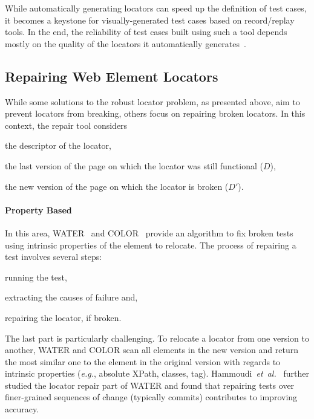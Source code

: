While automatically generating locators can speed up the
definition of test cases, it becomes a keystone for visually-generated test
cases based on record/replay tools. In the end, the reliability of test cases
built using such a tool depends mostly on the quality of the locators it
automatically generates~\cite{hammoudi2016record}.


\subsection{Repairing Web Element Locators}
While some solutions to the robust locator problem, as presented above, aim to prevent locators from breaking, others focus on repairing broken locators.
In this context, the repair tool considers
\begin{inparaenum}[\em a)]
    \item the descriptor of the locator,
    \item the last version of the page on which the locator was still functional ($D$),
    \item the new version of the page on which the locator is broken ($D'$).
\end{inparaenum}

\paragraph{Property Based}
In this area, WATER~\cite{choudhary2011water} and COLOR~\cite{kirinuki2019color}
provide an algorithm to fix broken tests using intrinsic properties of the element
to relocate.
The process of repairing a test involves several steps: 
\begin{inparaenum}
\item running the test, 
\item extracting the causes of failure and,
\item repairing the locator, if broken. 
\end{inparaenum}
The last part is particularly challenging. 
To relocate a locator from one version to another, WATER and COLOR scan all elements in the new version and return the most similar one to the element in the original version with regards to intrinsic properties (\emph{e.g.}, absolute XPath, classes, tag).
Hammoudi~\emph{et~al.}~\cite{hammoudi2016waterfall} further studied the locator repair part of WATER and found that repairing tests over finer-grained sequences of change (typically commits) contributes to improving accuracy.

